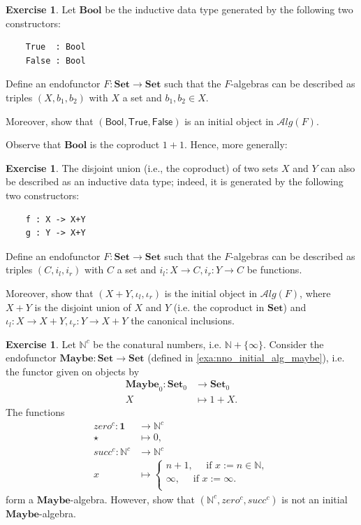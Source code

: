 \documentclass[a4paper,11pt, oneside,titlepage=false]{scrbook}
\theoremstyle{plain}
\theoremstyle{definition}
\newtheorem{exer}[thm]{Exercise}
\newcommand{\Cat}[1]{\mathcal{#1}}
\newcommand{\Catb}[1]{\mathbf{#1}}
\newcommand{\Maybe}{\Catb{Maybe}}
\newcommand{\SET}{\Catb{Set}}
\newcommand{\ALG}[1]{\Cat{A}lg(#1)}
\newcommand{\Ob}[1]{{#1}_0}
\newcommand{\inl}{\ensuremath{\iota_l}}
\newcommand{\inr}{\ensuremath{\iota_r}}
\begin{document}
\begin{exer}\label{exer:bool_as_initial_algebra}
  Let $\mathbf{Bool}$ be the inductive data type generated by the following two constructors:
\begin{lstlisting}
    True  : Bool
    False : Bool
\end{lstlisting}
  Define an endofunctor $F:\SET\to \SET$ such that the $F$-algebras can be described as triples $(X, b_1, b_2)$ with $X$ a set and $b_1,b_2\in X$.

  Moreover, show that $(\mathsf{Bool}, \mathsf{True}, \mathsf{False})$ is an initial object in $\ALG{F}$.
\end{exer}

Observe that $\mathbf{Bool}$ is the coproduct $1 + 1$.
Hence, more generally:
\begin{exer}\label{exer:coproduct_as_initial_algebra}
  The disjoint union (i.e., the coproduct) of two sets $X$ and $Y$ can also be described as an inductive data type; indeed, it is generated by the following two constructors:
\begin{lstlisting}
    f : X -> X+Y
    g : Y -> X+Y
\end{lstlisting}
  Define an endofunctor $F:\SET\to \SET$ such that the $F$-algebras can be described as triples $(C, i_l, i_r)$ with $C$ a set and $i_l : X\to C, i_r : Y\to C$ be functions.

  Moreover, show that $(X + Y, \inl, \inr)$ is the initial object in $\ALG{F}$, where $X+Y$ is the disjoint union of $X$ and $Y$ (i.e. the coproduct in $\SET$) and $\inl:X\to X+Y, \inr:Y\to X+Y$ the canonical inclusions.
\end{exer}

\begin{exer}\label{exer:conatural_numbers_are_not_initial}
Let $\mathbb{N}^{c}$ be the conatural numbers, i.e. $\mathbb{N} + \{\infty\}$. Consider the endofunctor $\Maybe : \SET \to \SET$ (defined in \cref{exa:nno_initial_alg_maybe}), i.e. the functor given on objects by
\begin{align*}
  \Ob{\Maybe} : \Ob{\SET} &\to \Ob{\SET}
  \\
  X &\mapsto 1 + X.
\end{align*}
The functions
\begin{align*}
zero^{c} : \mathbf{1}&\to \mathbb{N}^{c} \\
           \star&\mapsto 0,\\
succ^{c} : \mathbb{N}^{c}&\to \mathbb{N}^{c} \\
          x & \mapsto
\begin{cases}
n+1,\quad  \text{ if } x := n\in\mathbb{N},\\
\infty,\quad  \text{ if } x := \infty.\\
\end{cases}
\end{align*}
form a $\Maybe$-algebra. However, show that $(\mathbb{N}^{c},zero^{c},succ^{c})$ is not an initial $\Maybe$-algebra.
\end{exer}
\end{document}
